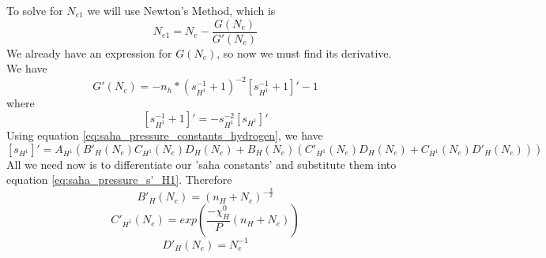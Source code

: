 \documentclass{article}
\begin{document}
			To solve for $N_{e1}$ we will use Newton's Method, which is
			\begin{equation} \label{eq:N_e1_hydrogen}
				N_{e1} = N_e - \frac{G(N_e)}{G'(N_e)}
			\end{equation}
			We already have an expression for $G(N_e)$, so now we must find its derivative. We
			have
			\begin{equation} \label{eq:G'(N_e)_hydrogen}
				G'(N_e) = - n_h * \left( s_{H^1}^{-1} + 1 \right)^{-2} 
							\left[ s_{H^1}^{-1} + 1 \right]' - 1
			\end{equation}
			where
			\begin{equation} 
				\left[ s_{H^1}^{-1} + 1 \right]' = -s_{H^1}^{-2} \left[ s_{H^1} \right]' 
			\end{equation}
			Using equation \ref{eq:saha_pressure_constants_hydrogen}, we have
			\begin{equation} \label{eq:saha_pressure_s'_H1}
				\left[ s_{H^1} \right]' = A_{H^{1}} (B'_H(N_e) C_{H^1}(N_e) D_H(N_e) + 
					B_H(N_e) ( C'_{H^1}(N_e) D_H(N_e) + C_{H^1}(N_e) D'_H(N_e) ) )
			\end{equation}
			All we need now is to differentiate our 'saha constants' and substitute them into
			equation \ref{eq:saha_pressure_s'_H1}. Therefore
			\begin{equation} \label{eq:saha_pressure_B'_H_Ne}
				B'_H(N_e) = (n_H + N_e)^{-\frac{3}{2}}
			\end{equation}
			\begin{equation} \label{eq:saha_pressure_C'_H1_Ne}
				C'_{H^1}(N_e) = exp\left(\frac{-\chi^0_H}{P} \left(n_H + N_e \right)\right) 
			\end{equation}
			\begin{equation} \label{eq:saha_pressure_D'_H_Ne}
				D'_H(N_e) = N_e^{-1}
			\end{equation}
\end{document}
